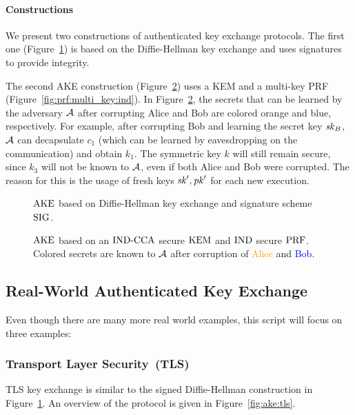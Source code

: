 \paragraph{Constructions} We present two constructions of authenticated key exchange protocols. 
The first one (Figure~\ref{fig:ake:signed_dh}) is based on the Diffie-Hellman key exchange and uses signatures to provide integrity.

The second AKE construction (Figure~\ref{fig:ake:kem}) uses a KEM and a multi-key PRF (Figure~\ref{fig:prf:multi_key:ind}). 
In Figure~\ref{fig:ake:kem}, the secrets that can be learned by the adversary $\mathcal{A}$ after corrupting Alice and Bob are colored orange and blue, respectively.
For example, after corrupting Bob and learning the secret key $\mathit{sk}_B$, $\mathcal{A}$ can decapsulate $c_1$ (which can be learned by eavesdropping on the communication) and obtain $k_1$.
The symmetric key $k$ will still remain secure, since $k_3$ will not be known to $\mathcal{A}$, even if both Alice and Bob were corrupted.
The reason for this is the usage of fresh keys $\mathit{sk}',\mathit{pk}'$ for each new execution.

\begin{figure}[!ht]
    \centering
    
    \caption{$\mathrm{AKE}$ based on Diffie-Hellman key exchange and signature scheme $\mathrm{SIG}$.}
    \label{fig:ake:signed_dh}
\end{figure}

\begin{figure}[!ht]
    \centering
    
    \caption{$\mathrm{AKE}$ based on an ${\mathrm{IND}\text{-}\mathrm{CCA}}$ secure $\mathrm{KEM}$ and ${\mathrm{IND}}$ secure $\mathrm{PRF}$. Colored secrets are known to $\mathcal{A}$ after corruption of \textcolor{orange}{Alice} and \textcolor{blue}{Bob}.}
    \label{fig:ake:kem}
\end{figure}

\subsection{Real-World Authenticated Key Exchange}
Even though there are many more real world examples, this script will focus on three examples:

\subsubsection{Transport Layer Security~(TLS)}
TLS key exchange is similar to the signed Diffie-Hellman construction in Figure~\ref{fig:ake:signed_dh}.
An overview of the protocol is given in Figure~\ref{fig:ake:tls}.

